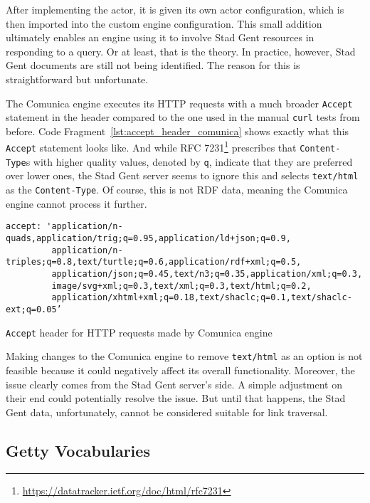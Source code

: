 After implementing the actor, it is given its own actor configuration, which is then imported into the custom engine configuration. This small addition ultimately enables an engine using it to involve Stad Gent resources in responding to a query. Or at least, that is the theory. In practice, however, Stad Gent documents are still not being identified. The reason for this is straightforward but unfortunate.

The Comunica engine executes its HTTP requests with a much broader \texttt{Accept} statement in the header compared to the one used in the manual \texttt{curl} tests from before. Code Fragment~\ref{lst:accept_header_comunica} shows exactly what this \texttt{Accept} statement looks like. And while RFC 7231\footnote{\url{https://datatracker.ietf.org/doc/html/rfc7231}} prescribes that \texttt{Content-Type}s with higher quality values, denoted by \texttt{q}, indicate that they are preferred over lower ones, the Stad Gent server seems to ignore this and selects \texttt{text/html} as the \texttt{Content-Type}. Of course, this is not RDF data, meaning the Comunica engine cannot process it further. \citep{fielding2014http}

\begin{listing}[htbp]
    \begin{verbatim}
accept: 'application/n-quads,application/trig;q=0.95,application/ld+json;q=0.9,
         application/n-triples;q=0.8,text/turtle;q=0.6,application/rdf+xml;q=0.5,
         application/json;q=0.45,text/n3;q=0.35,application/xml;q=0.3,
         image/svg+xml;q=0.3,text/xml;q=0.3,text/html;q=0.2,
         application/xhtml+xml;q=0.18,text/shaclc;q=0.1,text/shaclc-ext;q=0.05’
    \end{verbatim}
    \caption{\texttt{Accept} header for HTTP requests made by Comunica engine}
    \label{lst:accept_header_comunica}
\end{listing}

Making changes to the Comunica engine to remove \texttt{text/html} as an option is not feasible because it could negatively affect its overall functionality. Moreover, the issue clearly comes from the Stad Gent server's side. A simple adjustment on their end could potentially resolve the issue. But until that happens, the Stad Gent data, unfortunately, cannot be considered suitable for link traversal.

\subsection{Getty Vocabularies}

